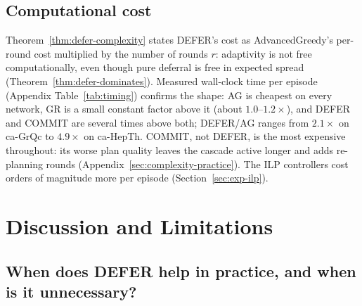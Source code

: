 \documentclass[11pt]{article}
\theoremstyle{definition}
\theoremstyle{remark}
\begin{document}
\subsection{Computational cost}\label{sec:complexity-comparison}

Theorem~\ref{thm:defer-complexity} states DEFER's cost as AdvancedGreedy's per-round cost multiplied by the number of rounds $r$: adaptivity is not free computationally, even though pure deferral is free in expected spread (Theorem~\ref{thm:defer-dominates}). Measured wall-clock time per episode (Appendix Table~\ref{tab:timing}) confirms the shape: AG is cheapest on every network, GR is a small constant factor above it (about $1.0$--$1.2\times$), and DEFER and COMMIT are several times above both; DEFER/AG ranges from $2.1\times$ on ca-GrQc to $4.9\times$ on ca-HepTh. COMMIT, not DEFER, is the most expensive throughout: its worse plan quality leaves the cascade active longer and adds re-planning rounds (Appendix~\ref{sec:complexity-practice}). The ILP controllers cost orders of magnitude more per episode (Section~\ref{sec:exp-ilp}).

\section{Discussion and Limitations}\label{sec:discussion}
\subsection{When does DEFER help in practice, and when is it unnecessary?}
\end{document}
